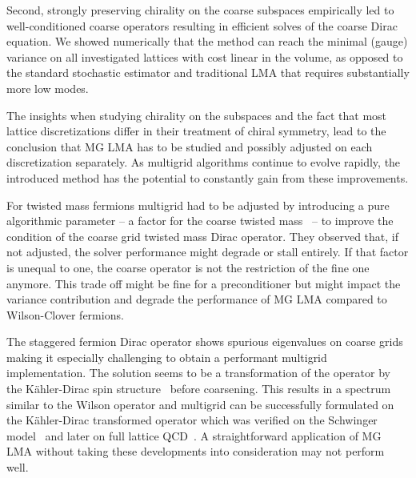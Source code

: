 Second, strongly preserving chirality on the coarse subspaces empirically led to well-conditioned coarse operators resulting in efficient solves of the coarse Dirac equation.
We showed numerically that the method can reach the minimal (gauge) variance on all investigated lattices with cost linear in the volume, as opposed to the standard stochastic estimator and traditional LMA that requires substantially more low modes.

The insights when studying chirality on the subspaces and the fact that most lattice discretizations differ in their treatment of chiral symmetry, lead to the conclusion that MG LMA has to be studied and possibly adjusted on each discretization separately.
As multigrid algorithms continue to evolve rapidly, the introduced method has the potential to constantly gain from these improvements.

For twisted mass fermions multigrid had to be adjusted by introducing a pure algorithmic parameter -- a factor for the coarse twisted mass~\cite{Alexandrou:2016izb} -- to improve the condition of the coarse grid twisted mass Dirac operator.
They observed that, if not adjusted, the solver performance might degrade or stall entirely.
If that factor is unequal to one, the coarse operator is not the restriction of the fine one anymore.
This trade off might be fine for a preconditioner but might impact the variance contribution and degrade the performance of MG LMA compared to Wilson-Clover fermions.

The staggered fermion Dirac operator shows spurious eigenvalues on coarse grids~\cite{Brower:2018ymy} making it especially challenging to obtain a performant multigrid implementation.
The solution seems to be a transformation of the operator by the Kähler-Dirac spin structure~\cite{Becher:1982ud,Bodwin:1987ah} before coarsening.
This results in a spectrum similar to the Wilson operator and multigrid can be successfully formulated on the Kähler-Dirac transformed operator which was verified on the Schwinger model~\cite{Brower:2018ymy} and later on full lattice QCD~\cite{Ayyar:2022krp}.
A straightforward application of MG LMA without taking these developments into consideration may not perform well.

